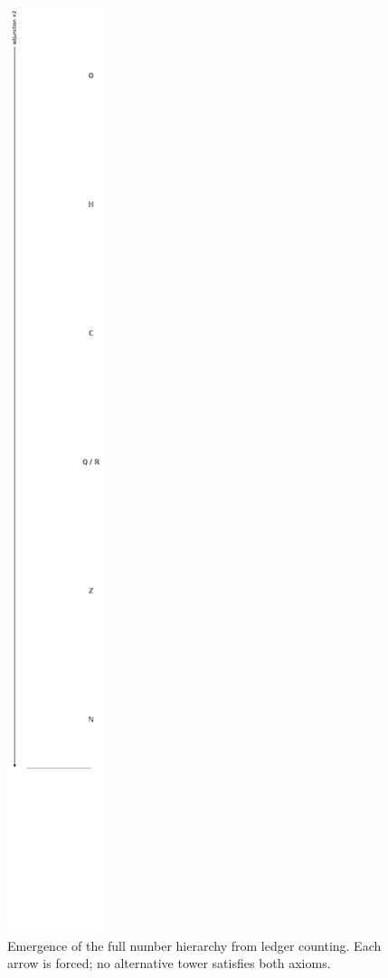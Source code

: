 \begin{figure}[t]
  \centering
  \includegraphics[width=\linewidth]{figs/number_tower_flow.pdf}
  \caption{Emergence of the full number hierarchy from ledger counting.
           Each arrow is forced; no alternative tower satisfies both axioms.}
  \label{fig:number-tower}
\end{figure}

